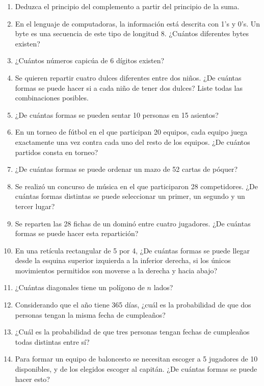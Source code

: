 \documentclass[spanish]{report}
\begin{document}
\begin{enumerate}
\item Deduzca el principio del complemento a partir del principio de la suma.

\item En el lenguaje de computadoras, la información está descrita con 1's y 0's. Un byte es una secuencia de este tipo de longitud 8.
¿Cuántos diferentes bytes existen?

\item ¿Cuántos números capicúa de 6 dígitos existen?

\item Se quieren repartir cuatro dulces diferentes entre dos niños. ¿De cuántas formas se puede hacer si a cada niño de tener dos dulces? Liste todas las combinaciones posibles.

\item ¿De cuántas formas se pueden sentar 10 personas en 15 asientos?

\item En un torneo de fútbol en el que participan 20 equipos, cada equipo juega exactamente una vez contra cada uno del resto de los equipos. ¿De cuántos partidos consta en torneo?

\item ¿De cuántas formas se puede ordenar un mazo de 52 cartas de póquer?

\item Se realizó un concurso de música en el que participaron 28 competidores. ¿De cuántas formas distintas se puede seleccionar un primer, un segundo y un tercer lugar?

\item Se reparten las 28 fichas de un dominó entre cuatro jugadores. ¿De cuántas formas se puede hacer esta repartición?

\item En una retícula rectangular de 5 por 4, ¿De cuántas formas se puede llegar desde la esquina superior izquierda a la inferior derecha, si los únicos movimientos permitidos son moverse a la derecha y hacia abajo?

\item ¿Cuántas diagonales tiene un polígono de $n$ lados?

\item Considerando que el año tiene 365 días, ¿cuál es la probabilidad de que dos personas tengan la misma fecha de cumpleaños?

\item ¿Cuál es la probabilidad de que tres personas tengan fechas de cumpleaños todas distintas entre sí?

\item Para formar un equipo de baloncesto se necesitan escoger a 5 jugadores de 10 disponibles, y de los elegidos escoger al capitán. ¿De cuántas formas se puede hacer esto?

\end{enumerate}
\end{document}
